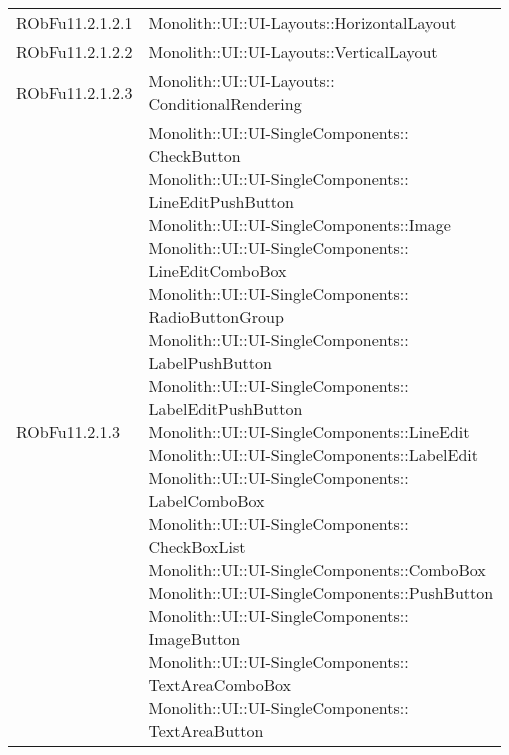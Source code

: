 \begin{center}
\begin{longtable}{|
*{1}{>{\centering\arraybackslash}m{2.5cm}|}
*{1}{>{\centering\arraybackslash}m{7.5cm}|}}
{\\Monolith::UI::UI-Layouts::HorizontalLayout
\\}\\\hline
RObFu11.2.1.2.1 & \makecell[l]{Monolith::UI::UI-Layouts::HorizontalLayout
\\}\\\hline
RObFu11.2.1.2.2 & \makecell[l]{Monolith::UI::UI-Layouts::VerticalLayout
\\}\\\hline
RObFu11.2.1.2.3 & \makecell[l]{Monolith::UI::UI-Layouts:: \\ \hfill ConditionalRendering
\\}\\\hline
RObFu11.2.1.3 & \makecell[l]{Monolith::UI::UI-SingleComponents:: \\ \hfill CheckButton
\\Monolith::UI::UI-SingleComponents:: \\ \hfill LineEditPushButton
\\Monolith::UI::UI-SingleComponents::Image
\\Monolith::UI::UI-SingleComponents:: \\ \hfill LineEditComboBox
\\Monolith::UI::UI-SingleComponents:: \\ \hfill RadioButtonGroup
\\Monolith::UI::UI-SingleComponents:: \\ \hfill LabelPushButton
\\Monolith::UI::UI-SingleComponents:: \\ \hfill LabelEditPushButton
\\Monolith::UI::UI-SingleComponents::LineEdit
\\Monolith::UI::UI-SingleComponents::LabelEdit
\\Monolith::UI::UI-SingleComponents:: \\ \hfill LabelComboBox
\\Monolith::UI::UI-SingleComponents:: \\ \hfill CheckBoxList
\\Monolith::UI::UI-SingleComponents::ComboBox
\\Monolith::UI::UI-SingleComponents::PushButton
\\Monolith::UI::UI-SingleComponents:: \\ \hfill ImageButton
\\Monolith::UI::UI-SingleComponents:: \\ \hfill TextAreaComboBox
\\Monolith::UI::UI-SingleComponents:: \\ \hfill TextAreaButton
}
\end{longtable}
\end{center}
